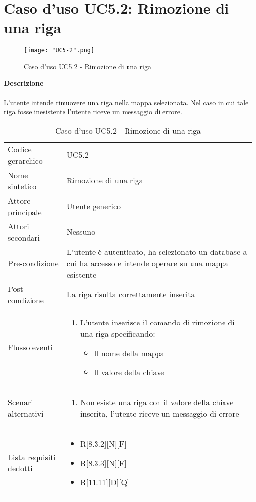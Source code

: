 \documentclass[a4paper]{report}
\begin{document}
	 \section{Caso d'uso UC5.2: Rimozione di una riga}
	 \begin{figure}[H]
			\centering
			\texttt{[image: "UC5-2".png]}
			\caption{Caso d'uso UC5.2 - Rimozione di una riga}
		\end{figure}
	 \textbf{Descrizione} \\ \\
	 L'utente intende rimuovere una riga nella mappa selezionata. Nel caso in cui tale riga fosse inesistente
	 l'utente riceve un messaggio di errore.
		\begin{table}[H]
		\begin{tabularx}{\textwidth}{X | X}\toprule
			\rowcolor{orange!65}Codice gerarchico & UC5.2\\
			Nome sintetico & Rimozione di una riga\\
			\rowcolor{orange!65}Attore principale & Utente generico\\
			Attori secondari & Nessuno \\
			\rowcolor{orange!65}Pre-condizione & L'utente è autenticato, ha selezionato un database a cui ha 
			accesso e intende operare su una mappa esistente\\
			Post-condizione & La riga risulta correttamente inserita\\
			\rowcolor{orange!65}Flusso eventi & \begin{enumerate}
			\item L'utente inserisce il comando di rimozione di una riga specificando:
			\begin{itemize}
				\item Il nome della mappa
				\item Il valore della chiave
			\end{itemize}
			\end{enumerate} \\
			Scenari alternativi & \begin{enumerate}
			\item Non esiste una riga con il valore della chiave inserita, l'utente riceve un messaggio di errore
			\end{enumerate}			 \\
			\rowcolor{orange!65}Lista requisiti dedotti & \begin{itemize}
				\item R[8.3.2][N][F]
				\item R[8.3.3][N][F]
				\item R[11.11][D][Q]
				\end{itemize} \\
			\bottomrule
		\end{tabularx}
		\caption{Caso d'uso UC5.2 - Rimozione di una riga}
	 \end{table}
	 
\end{document}

